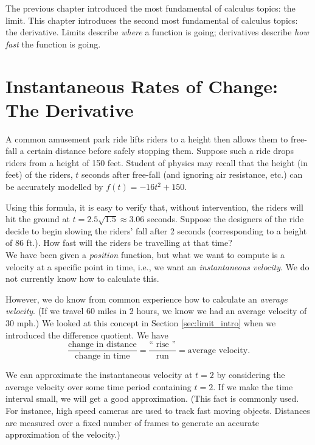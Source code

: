 The previous chapter introduced the most fundamental of calculus topics: the limit. This chapter introduces the second most fundamental of calculus topics: the derivative. Limits describe \textit{where} a function is going; derivatives describe \textit{how fast} the function is going.

\section{Instantaneous Rates of Change: The Derivative}\label{sec:derivative}

A common amusement park ride lifts riders to a height then allows them to free-fall a certain distance before safely stopping them. Suppose such a ride drops riders from a height of 150 feet. Student of physics may recall that the height (in feet) of the riders, $t$ seconds after free-fall (and ignoring air resistance, etc.) can be accurately modelled by $f(t) = -16t^2+150$. 

Using this formula, it is easy to verify that, without intervention, the riders will hit the ground at $t=2.5\sqrt{1.5} \approx 3.06$ seconds. Suppose the designers of the ride decide to begin slowing the riders' fall after 2 seconds (corresponding to a height of 86 ft.). How fast will the riders be travelling at that time?\\

We have been given a \textit{position} function, but what we want to compute is a velocity at a specific point in time, i.e., we want an \textit{instantaneous velocity}. We do not currently know how to calculate this.

However, we do know from common experience how to calculate an \textit{average velocity}. (If we travel 60 miles in 2 hours, we know we had an average velocity of 30 mph.) We looked at this concept in Section \ref{sec:limit_intro} when we introduced the difference quotient. We have 
	\[
	\frac{\text{change in distance}}{\text{change in time}} = \frac{\text{``\ rise\ ''}}{\text{run}} = \text{average velocity}.
	\]
	
We can approximate the instantaneous velocity at $t=2$ by considering the average velocity over some time period containing $t=2$. If we make the time interval small, we will get a good approximation. (This fact is commonly used. For instance, high speed cameras are used to track fast moving objects. Distances are measured over a fixed number of frames to generate an accurate approximation of the velocity.)

